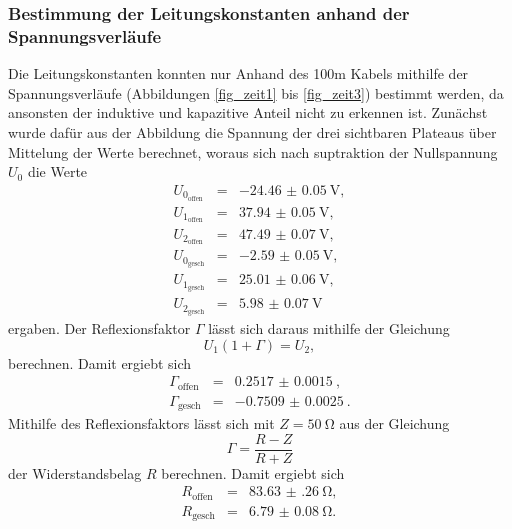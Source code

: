 \subsubsection{Bestimmung der Leitungskonstanten anhand der Spannungsverläufe} %
\label{sub:bestimmung_der_kabellaenge_anhand_der_spannungsverlaeufe}

Die Leitungskonstanten konnten nur Anhand des 100m Kabels mithilfe der Spannungsverläufe (Abbildungen \ref{fig_zeit1} bis \ref{fig_zeit3}) bestimmt werden, da ansonsten der induktive und kapazitive Anteil nicht zu erkennen ist.
Zunächst wurde dafür aus der Abbildung die Spannung der drei sichtbaren Plateaus über Mittelung der Werte berechnet, woraus sich nach suptraktion der Nullspannung $U_0$ die Werte
\begin{eqnarray*}
	U_{0_\text{offen}} &=& \SI{-24.46(5)}{\volt},\\
	U_{1_\text{offen}} &=& \SI{37.94(5)}{\volt},\\
	U_{2_\text{offen}} &=& \SI{47.49(7)}{\volt},\\
	U_{0_\text{gesch}} &=& \SI{-2.59(5)}{\volt},\\
	U_{1_\text{gesch}} &=& \SI{25.01(6)}{\volt},\\
	U_{2_\text{gesch}} &=& \SI{5.98(7)}{\volt}
\end{eqnarray*}
ergaben.
Der Reflexionsfaktor $\Gamma$ lässt sich daraus mithilfe der Gleichung
\begin{equation*}
	U_1 (1+\Gamma) = U_2,
\end{equation*}
 berechnen.
Damit ergiebt sich
\begin{eqnarray*}
	\Gamma_\text{offen} &=& \SI{0.2517(15)}{},\\
	\Gamma_\text{gesch} &=& \SI{-0.7509(25)}{}.
\end{eqnarray*}
Mithilfe des Reflexionsfaktors lässt sich mit $Z=\SI{50}{\ohm}$ aus der Gleichung
\begin{equation*}
	\Gamma = \frac{R-Z}{R+Z}
\end{equation*}
der Widerstandsbelag $R$ berechnen.
Damit ergiebt sich
\begin{eqnarray*}
	R_\text{offen} &=& \SI{83.63(26)}{\ohm},\\
	R_\text{gesch} &=& \SI{6.79(8)}{\ohm}.
\end{eqnarray*}

